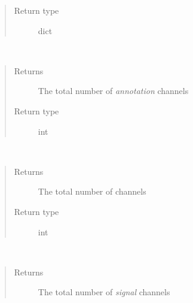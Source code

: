 \documentclass[letterpaper,10pt,english]{sphinxmanual}
\begin{document}
\begin{fulllineitems}
\begin{fulllineitems}
\begin{quote}
\begin{description}
\item[{Return type}] \leavevmode
dict

\end{description}\end{quote}

\end{fulllineitems}


\begin{fulllineitems}
\label{pyrem.polygram:pyrem.polygram.Polygram.n_annotations}~\begin{quote}\begin{description}
\item[{Returns}] \leavevmode
The total number of \emph{annotation} channels

\item[{Return type}] \leavevmode
int

\end{description}\end{quote}

\end{fulllineitems}


\begin{fulllineitems}
\label{pyrem.polygram:pyrem.polygram.Polygram.n_channels}~\begin{quote}\begin{description}
\item[{Returns}] \leavevmode
The total number of channels

\item[{Return type}] \leavevmode
int

\end{description}\end{quote}

\end{fulllineitems}


\begin{fulllineitems}
\label{pyrem.polygram:pyrem.polygram.Polygram.n_signals}~\begin{quote}\begin{description}
\item[{Returns}] \leavevmode
The total number of \emph{signal} channels


\end{description}
\end{quote}
\end{fulllineitems}
\end{fulllineitems}
\end{document}

